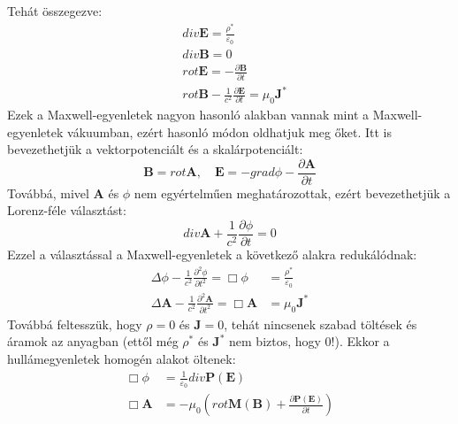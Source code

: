 \documentclass[../main.tex]{subfiles}
\begin{document}
Tehát összegezve:
\begin{equation}
    \boxed{
    \begin{aligned}
        &div \mathbf{E} = \frac{\rho^*}{\varepsilon_0} \\
        &div \mathbf{B} = 0 \\
        &rot \mathbf{E} = -\frac{\partial \mathbf{B}}{\partial t} \\
        &rot \mathbf{B} - \frac{1}{c^2} \frac{\partial \mathbf{E}}{\partial t} = \mu_0 \mathbf{J}^*
    \end{aligned}}
\end{equation}
Ezek a Maxwell-egyenletek nagyon hasonló alakban vannak mint a Maxwell-egyenletek vákuumban, ezért hasonló módon oldhatjuk meg őket. Itt is bevezethetjük a vektorpotenciált és a skalárpotenciált:
\begin{equation}
    \mathbf{B} = rot \mathbf{A}, \quad \mathbf{E} = -grad \phi - \frac{\partial \mathbf{A}}{\partial t}
\end{equation}
Továbbá, mivel $\mathbf{A}$ és $\phi$ nem egyértelműen meghatározottak, ezért bevezethetjük a Lorenz-féle választást:
\begin{equation}
    div \mathbf{A} + \frac{1}{c^2} \frac{\partial \phi}{\partial t} = 0
\end{equation}
Ezzel a választással a Maxwell-egyenletek a következő alakra redukálódnak:
\begin{equation}
    \boxed{
    \begin{aligned}
        \Delta \phi - \frac{1}{c^2} \frac{\partial^2 \phi}{\partial t^2} = \Box \phi &= \frac{\rho^*}{\varepsilon_0} \\
        \Delta \mathbf{A} - \frac{1}{c^2} \frac{\partial^2 \mathbf{A}}{\partial t^2} = \Box \mathbf{A} &= \mu_0 \mathbf{J}^*
    \end{aligned}}
\end{equation}
Továbbá feltesszük, hogy $\rho = 0$ és $\mathbf{J} = 0$, tehát nincsenek szabad töltések és áramok az anyagban (ettől még $\rho^*$ és $\mathbf{J}^*$ nem biztos, hogy 0!).
Ekkor a hullámegyenletek homogén alakot öltenek:
\begin{equation}
    \begin{aligned}
        \Box \phi &= \frac{1}{\varepsilon_0} div \mathbf{P}(\mathbf{E}) \\
        \Box \mathbf{A} &= - \mu_0 \left(rot \mathbf{M}(\mathbf{B}) + \frac{\partial \mathbf{P}(\mathbf{E})}{\partial t}\right)
    \end{aligned}
\end{equation}
\end{document}
